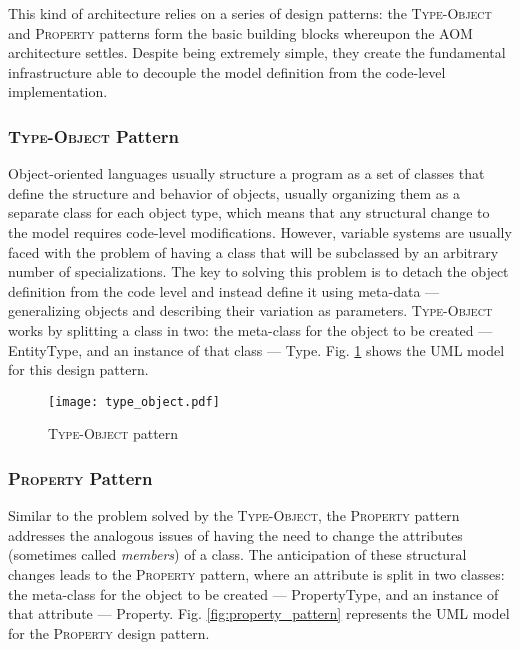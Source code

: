 This kind of architecture relies on a series of design patterns: the \textsc{Type-Object} and \textsc{Property} patterns form the basic building blocks whereupon the AOM architecture settles. Despite being extremely simple, they create the fundamental infrastructure able to decouple the model definition from the code-level implementation.

\subsubsection{\textsc{Type-Object} Pattern}\label{sec:type-object_pattern}

Object-oriented languages usually structure a program as a set of classes that define the structure and behavior of objects, usually organizing them as a separate class for each object type, which means that any structural change to the model requires code-level modifications. However, variable systems are usually faced with the problem of having a class that will be subclassed by an arbitrary number of specializations. The key to solving this problem is to detach the object definition from the code level and instead define it using meta-data --- generalizing objects and describing their variation as parameters. \textsc{Type-Object} works by splitting a class in two: the meta-class for the object to be created --- EntityType, and an instance of that class --- Type. Fig. \ref{fig:type-object_pattern} shows the UML model for this design pattern.

\begin{figure}[H]
  \centering
  \texttt{[image: type\_object.pdf]}
  \caption{\textsc{Type-Object} pattern}
  \label{fig:type-object_pattern}
\end{figure}

\subsubsection{\textsc{Property} Pattern}\label{sec:property_pattern}

Similar to the problem solved by the \textsc{Type-Object}, the \textsc{Property} pattern addresses the analogous issues of having the need to change the attributes (sometimes called \emph{members}) of a class. The anticipation of these structural changes leads to the \textsc{Property} pattern, where an attribute is split in two classes: the meta-class for the object to be created --- PropertyType, and an instance of that attribute --- Property. Fig. \ref{fig:property_pattern} represents the UML model for the \textsc{Property} design pattern.

